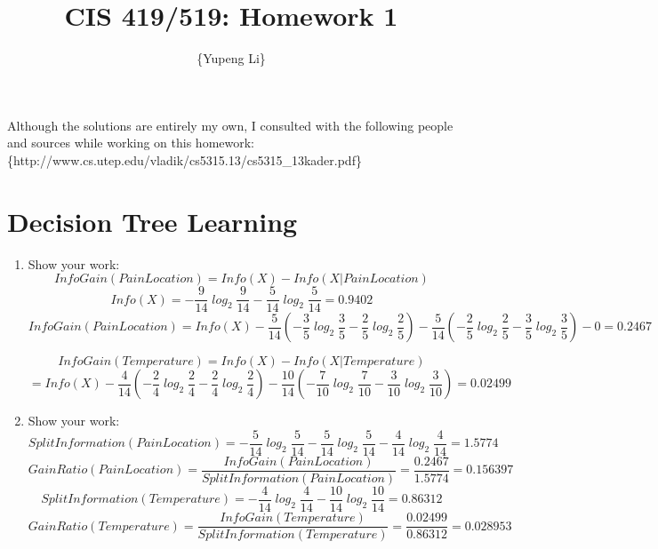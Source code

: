 \documentclass{article}
\title{CIS 419/519: Homework 1}
\author{\{Yupeng Li\}}
\date{}
\begin{document}
    \maketitle
    Although the solutions are entirely my own, I consulted with the following people and sources while working on this homework:
     \{http://www.cs.utep.edu/vladik/cs5315.13/cs5315\_13kader.pdf\}
    
    \section{Decision Tree Learning}
        \begin{enumerate}[label=\alph*.]
            \item %
            Show your work:
            \begin{equation*}
                \mathit{InfoGain}(\mathit{PainLocation}) = \mathit{Info(X)- Info(X | PainLocation)} 
            \end{equation*}
	    \[\mathit{Info(X) = -\frac{9}{14} \log_2 \frac{9}{14} - \frac{5}{14} \log_2 \frac{5}{14} = 0.9402}\]
	    \[\mathit{InfoGain(PainLocation) = Info(X) - \frac{5}{14} (-\frac{3}{5} \log_2 \frac{3}{5} - \frac{2}{5} \log_2 \frac{2}{5}) - \frac{5}{14} (-\frac{2}{5} \log_2 \frac{2}{5} - \frac{3}{5} \log_2 \frac{3}{5})-0 = 0.2467}\]
		
            \begin{equation*}
                \mathit{InfoGain}(\mathit{Temperature}) =\mathit{Info(X) - Info(X | Temperature)}
            \end{equation*}
            \[\mathit{= Info(X) - \frac{4}{14} (-\frac{2}{4} \log_2 \frac{2}{4} - \frac{2}{4} \log_2 \frac{2}{4}) - \frac{10}{14} (-\frac{7}{10} \log_2 \frac{7}{10} - \frac{3}{10} \log_2 \frac{3}{10}) = 0.02499}\] 
            
            
            \item %
            Show your work:
            \[\mathit{SplitInformation(PainLocation) = -\frac{5}{14} \log_2 \frac{5}{14} -\frac{5}{14} \log_2 \frac{5}{14} - \frac{4}{14} \log_2 \frac{4}{14} = 1.5774}\]
            \begin{equation*}
                \mathit{GainRatio}(\mathit{PainLocation}) = \mathit{\frac{InfoGain(PainLocation)}{SplitInformation(PainLocation)}} = \mathit{\frac{0.2467}{1.5774}} = \mathit{0.156397}
            \end{equation*}
             \[\mathit{SplitInformation(Temperature) = -\frac{4}{14} \log_2 \frac{4}{14} -\frac{10}{14} \log_2 \frac{10}{14}  = 0.86312}\]
            \begin{equation*}
                \mathit{GainRatio}(\mathit{Temperature}) = \mathit{\frac{InfoGain(Temperature)}{SplitInformation(Temperature)}} = \mathit{\frac{0.02499}{0.86312}} = \mathit{0.028953}
            \end{equation*}
            

\end{enumerate}
\end{document}
